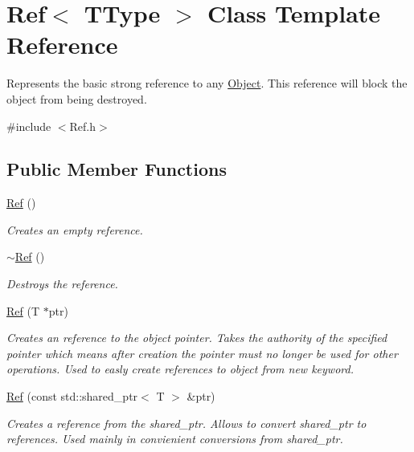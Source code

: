 \hypertarget{class_ref}{}\section{Ref$<$ T\+Type $>$ Class Template Reference}
\label{class_ref}


Represents the basic strong reference to any \mbox{\hyperlink{class_object}{Object}}. This reference will block the object from being destroyed.  




{\ttfamily \#include $<$Ref.\+h$>$}

\subsection*{Public Member Functions}
\begin{DoxyCompactItemize}
\item 
\mbox{\hyperlink{class_ref_a73f8a459509492ff5281240d2eefb2d5}{Ref}} ()
\begin{DoxyCompactList}\small\item\em Creates an empty reference. \end{DoxyCompactList}\item 
\mbox{\hyperlink{class_ref_a51a02585d57ba2d0fd2066372ed422c8}{$\sim$\+Ref}} ()
\begin{DoxyCompactList}\small\item\em Destroys the reference. \end{DoxyCompactList}\item 
\mbox{\hyperlink{class_ref_a235b1cec9594a29c7d4c6b58e92bc602}{Ref}} (T $\ast$ptr)
\begin{DoxyCompactList}\small\item\em Creates an reference to the object pointer. Takes the authority of the specified pointer which means after creation the pointer must no longer be used for other operations. Used to easly create references to object from new keyword. \end{DoxyCompactList}\item 
\mbox{\hyperlink{class_ref_ace2c482df7f5bc1b71cf36e962f0fd0a}{Ref}} (const std\+::shared\+\_\+ptr$<$ T $>$ \&ptr)
\begin{DoxyCompactList}\small\item\em Creates a reference from the shared\+\_\+ptr. Allows to convert shared\+\_\+ptr to references. Used mainly in convienient conversions from shared\+\_\+ptr. \end{DoxyCompactList}\item 

\end{DoxyCompactItemize}
